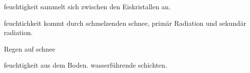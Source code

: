 feuchtigkeit sammelt sich zwischen den Eiskristallen an.

feuchtichkeit kommt durch schmelzenden schnee, primär Radiation und sekundär radiation.

Regen auf schnee

feuchtigkeit aus dem Boden. wasserführende schichten.
